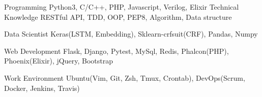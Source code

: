 

\begin{cvskills}

  \cvskill
    {Programming} %
    {Python3, C/C++, PHP, Javascript, Verilog, Elixir} %
  \cvskill
    {Technical Knowledge} %
    {RESTful API, TDD, OOP, PEP8, Algorithm, Data structure} %

  \cvskill
    {Data Scientist} %
    {Keras(LSTM, Embedding), Sklearn-crfsuit(CRF), Pandas, Numpy} %

  \cvskill
    {Web Development} %
    {Flask, Django, Pytest, MySql, Redis, Phalcon(PHP), Phoenix(Elixir), jQuery, Bootstrap} %

  \cvskill
    {Work Environment} %
    {Ubuntu(Vim, Git, Zsh, Tmux, Crontab), DevOps(Scrum, Docker, Jenkins, Travis)} %

\end{cvskills}
